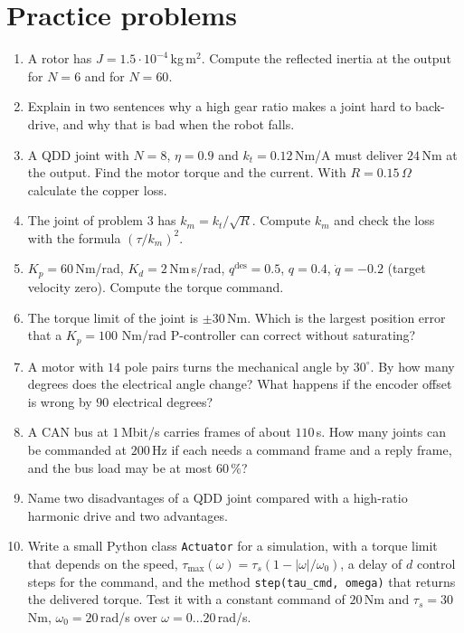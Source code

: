 \section*{Practice problems}
\begin{enumerate}[label=\textbf{\thechapter.\arabic*}]
  \item A rotor has $J=1.5\cdot10^{-4}$\,kg\,m$^2$. Compute the reflected inertia at the output for $N=6$ and for $N=60$.
  \item Explain in two sentences why a high gear ratio makes a joint hard to back-drive, and why that is bad when the robot falls.
  \item A QDD joint with $N=8$, $\eta=0.9$ and $k_t=0.12$\,Nm/A must deliver $24$\,Nm at the output. Find the motor torque and the current. With $R=0.15\,\Omega$ calculate the copper loss.
  \item The joint of problem 3 has $k_m=k_t/\sqrt R$. Compute $k_m$ and check the loss with the formula $(\tau/k_m)^2$.
  \item $K_p=60$\,Nm/rad, $K_d=2$\,Nm\,s/rad, $q^\text{des}=0.5$, $q=0.4$, $\dot q=-0.2$ (target velocity zero). Compute the torque command.
  \item The torque limit of the joint is $\pm30$\,Nm. Which is the largest position error that a $K_p=100$ Nm/rad P-controller can correct without saturating?
  \item A motor with $14$ pole pairs turns the mechanical angle by $30^\circ$. By how many degrees does the electrical angle change? What happens if the encoder offset is wrong by $90$ electrical degrees?
  \item A CAN bus at $1$\,Mbit/s carries frames of about $110$\,\textmu s. How many joints can be commanded at $200$\,Hz if each needs a command frame and a reply frame, and the bus load may be at most $60\,\%$?
  \item Name two disadvantages of a QDD joint compared with a high-ratio harmonic drive and two advantages.
  \item[\textbf{\thechapter.10}$\star$] Write a small Python class \texttt{Actuator} for a simulation, with a torque limit that depends on the speed, $\tau_\text{max}(\omega)=\tau_s(1-|\omega|/\omega_0)$, a delay of $d$ control steps for the command, and the method \texttt{step(tau\_cmd, omega)} that returns the delivered torque. Test it with a constant command of $20$\,Nm and $\tau_s=30$\,Nm, $\omega_0=20$\,rad/s over $\omega=0\ldots20$\,rad/s.
\end{enumerate}
